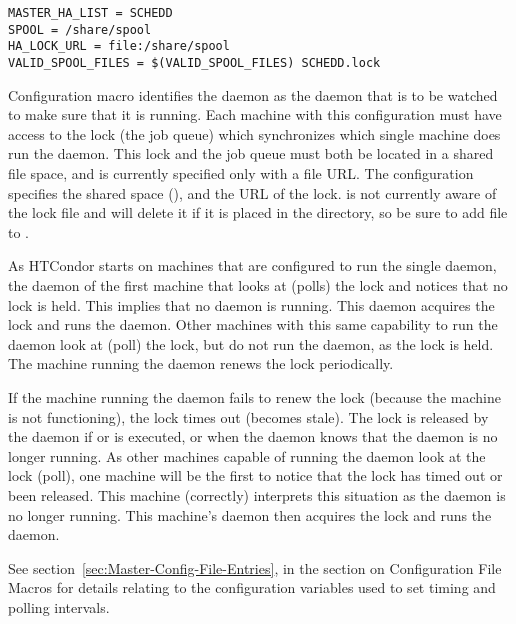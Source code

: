 \begin{verbatim}
MASTER_HA_LIST = SCHEDD
SPOOL = /share/spool
HA_LOCK_URL = file:/share/spool
VALID_SPOOL_FILES = $(VALID_SPOOL_FILES) SCHEDD.lock
\end{verbatim}

Configuration macro  identifies the 
 daemon as the daemon that is to be watched
to make sure that it is running.
Each machine with this configuration must have access to the
lock (the job queue) which synchronizes which single machine does run the
 daemon.
This lock and the job queue must both be located in a shared file space,
and is currently specified only with a file URL.
The configuration specifies the shared space
(),
and the URL of the lock.
 is not currently aware of the lock file and will
delete it if it is placed in the  directory, so be
sure to add file  to .

As HTCondor starts on machines that are configured to run
the single  daemon, 
the  daemon of the
first machine that looks at (polls) the lock
and notices that no lock is held.
This implies that no  daemon is running.
This  daemon acquires the lock
and runs the  daemon.
Other machines with this same capability to run the
 daemon look at (poll) the lock, 
but do not run the daemon, as the lock is held.
The machine running the  daemon renews the
lock periodically.

If the machine running the  daemon fails to renew
the lock (because the machine is not functioning),
the lock times out (becomes stale).
The lock is released by the  daemon
if  or  is
executed, or when the  daemon knows that the
 daemon is no longer running.
As other machines capable of running the  daemon
look at the lock (poll), one machine will be the first
to notice that the lock has timed out or been released.
This machine (correctly) interprets this situation as the
 daemon is no longer running.
This machine's  daemon then acquires the lock
and runs the  daemon.

See 
section~\ref{sec:Master-Config-File-Entries},
in the section on  Configuration File Macros
for details relating to the configuration variables
used to set timing and polling intervals.

